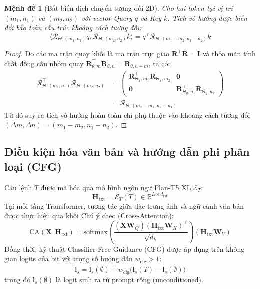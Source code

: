 \documentclass[10pt,twocolumn,letterpaper]{article}
\newtheorem{proposition}{Mệnh đề}
\begin{document}
\begin{proposition}[Bất biến dịch chuyển tương đối 2D]
Cho hai token tại vị trí $(m_1, n_1)$ và $(m_2, n_2)$ với vector Query $q$ và Key $k$. Tích vô hướng được biến đổi bảo toàn cấu trúc khoảng cách tương đối:
\begin{equation}
\langle \mathcal{R}_{\Theta, (m_1, n_1)} q, \mathcal{R}_{\Theta, (m_2, n_2)} k \rangle = q^\top \mathcal{R}_{\Theta, (m_1 - m_2, n_1 - n_2)} k
\end{equation}
\end{proposition}
\begin{proof}
Do các ma trận quay khối là ma trận trực giao $\mathbf{R}^\top \mathbf{R} = \mathbf{I}$ và thỏa mãn tính chất đồng cấu nhóm quay $\mathbf{R}_{\theta, m}^\top \mathbf{R}_{\theta, n} = \mathbf{R}_{\theta, n - m}$, ta có:
\begin{align}
\mathcal{R}_{\Theta, (m_1, n_1)}^\top \mathcal{R}_{\Theta, (m_2, n_2)} &= \begin{pmatrix}
\mathbf{R}_{\Theta_x, m_1}^\top \mathbf{R}_{\Theta_x, m_2} & \mathbf{0} \\
\mathbf{0} & \mathbf{R}_{\Theta_y, n_1}^\top \mathbf{R}_{\Theta_y, n_2}
\end{pmatrix} \nonumber \\
&= \mathcal{R}_{\Theta, (m_2 - m_1, n_2 - n_1)}
\end{align}
Từ đó suy ra tích vô hướng hoàn toàn chỉ phụ thuộc vào khoảng cách tương đối $(\Delta m, \Delta n) = (m_1 - m_2, n_1 - n_2)$.
\end{proof}

\subsection{Điều kiện hóa văn bản và hướng dẫn phi phân loại (CFG)}
Câu lệnh $T$ được mã hóa qua mô hình ngôn ngữ Flan-T5 XL $\mathcal{E}_T$:
\begin{equation}
\mathbf{H}_{\text{txt}} = \mathcal{E}_T(T) \in \mathbb{R}^{L \times d_{\text{txt}}}
\end{equation}
Tại mỗi tầng Transformer, tương tác giữa đặc trưng ảnh và ngữ cảnh văn bản được thực hiện qua khối Chú ý chéo (Cross-Attention):
\begin{equation}
\text{CA}(\mathbf{X}, \mathbf{H}_{\text{txt}}) = \text{softmax}\left(\frac{(\mathbf{X} \mathbf{W}_Q) (\mathbf{H}_{\text{txt}} \mathbf{W}_K)^\top}{\sqrt{d_k}}\right) (\mathbf{H}_{\text{txt}} \mathbf{W}_V)
\end{equation}
Đồng thời, kỹ thuật Classifier-Free Guidance (CFG) được áp dụng trên không gian logits của bit với trọng số hướng dẫn $w_{\text{cfg}} > 1$:
\begin{equation}
\widetilde{\mathbf{l}}_s = \mathbf{l}_s(\emptyset) + w_{\text{cfg}} \big(\mathbf{l}_s(T) - \mathbf{l}_s(\emptyset)\big)
\end{equation}
trong đó $\mathbf{l}_s(\emptyset)$ là logit sinh ra từ prompt rỗng (unconditioned).
\end{document}
